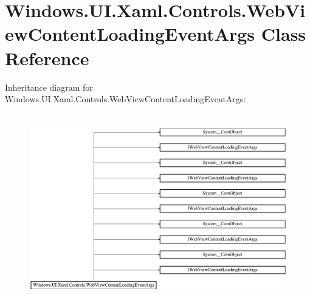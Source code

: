 \hypertarget{class_windows_1_1_u_i_1_1_xaml_1_1_controls_1_1_web_view_content_loading_event_args}{}\section{Windows.\+U\+I.\+Xaml.\+Controls.\+Web\+View\+Content\+Loading\+Event\+Args Class Reference}
\label{class_windows_1_1_u_i_1_1_xaml_1_1_controls_1_1_web_view_content_loading_event_args}
Inheritance diagram for Windows.\+U\+I.\+Xaml.\+Controls.\+Web\+View\+Content\+Loading\+Event\+Args\+:\begin{figure}[H]
\begin{center}
\leavevmode
\includegraphics[height=8.279570cm]{class_windows_1_1_u_i_1_1_xaml_1_1_controls_1_1_web_view_content_loading_event_args}
\end{center}
\end{figure}
